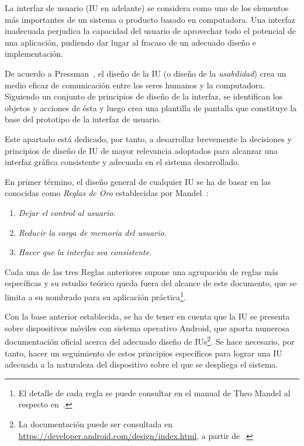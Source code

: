 La interfaz de usuario (IU en adelante) se considera como uno de los elementos más importantes de un sistema o producto basado en computadora. Una interfaz inadecuada perjudica la capacidad del usuario de aprovechar todo el potencial de una aplicación, pudiendo dar lugar al fracaso de un adecuado diseño e implementación.

De acuerdo a Pressman~\cite{Pre10}, el diseño de la IU (o diseño de la \emph{usabilidad}) crea un medio eficaz de comunicación entre los seres humanos y la computadora. Siguiendo un conjunto de principios de diseño de la interfaz, se identifican los objetos y acciones de ésta y luego crea una plantilla de pantalla que constituye la base del prototipo de la interfaz de usuario.

Este apartado está dedicado, por tanto, a desarrollar brevemente la decisiones y principios de diseño de IU de mayor relevancia adoptados para alcanzar una interfaz gráfica consistente y adecuada en el sistema desarrollado.

En primer término, el diseño general de cualquier IU se ha de basar en las conocidas como \emph{Reglas de Oro} establecidas por Mandel~\cite{Man97}:

\begin{enumerate}
	\item \textit{Dejar el control al usuario}.
	\item \textit{Reducir la carga de memoria del usuario}.
	\item \textit{Hacer que la interfaz sea consistente}.
\end{enumerate}

Cada una de las tres Reglas anteriores supone una agrupación de reglas más específicas y su estudio teórico queda fuera del alcance de este documento, que se limita a su nombrado para su aplicación práctica\footnote{El detalle de cada regla se puede consultar en el manual de Theo Mandel al respecto en~\cite{Man97}.}.

Con la base anterior establecida, se ha de tener en cuenta que la IU se presenta sobre dispositivos móviles con sistema operativo Android, que aporta numerosa documentación oficial acerca del adecuado diseño de IUs\footnote{La documentación puede ser consultada en \url{https://developer.android.com/design/index.html}, a partir de~\cite{AnDev}.}. Se hace necesario, por tanto, hacer un seguimiento de estos principios específicos para lograr una IU adecuada a la naturaleza del dispositivo sobre el que se despliega el sistema.

